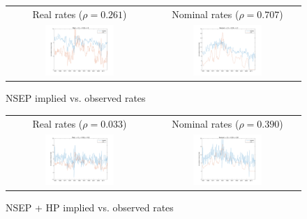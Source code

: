 \begin{figure}[h]
\ContinuedFloat
\centering
\begin{tabular}{cc}
Real rates ($\rho = 0.261$) & Nominal rates ($\rho = 0.707$) \\
\includegraphics[width=0.49\textwidth]{figs/nipa/implied-vs-ffr/real_nsep} &
\includegraphics[width=0.49\textwidth]{figs/nipa/implied-vs-ffr/nominal_nsep}
\end{tabular}
\caption{NSEP  implied vs. observed rates}
\end{figure}

\begin{figure}[h]
\ContinuedFloat
\centering
\begin{tabular}{cc}
Real rates ($\rho = 0.033$) & Nominal rates ($\rho = 0.390$) \\
\includegraphics[width=0.49\textwidth]{figs/nipa/implied-vs-ffr/real_nsep-hp} &
\includegraphics[width=0.49\textwidth]{figs/nipa/implied-vs-ffr/nominal_nsep-hp}
\end{tabular}
\caption{NSEP + HP implied vs. observed rates}
\end{figure}


